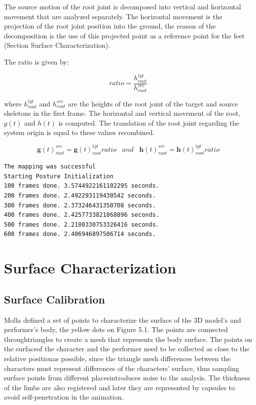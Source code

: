 \documentclass{vgtc}
\begin{document}
The source motion of the root joint is decomposed into vertical and
horizontal movement that are analyzed separately. The horizontal
movement is the projection of the root joint position into the ground,
the reason of the decomposition is the use of this projected point as a
reference point for the feet (Section Surface Characterization).

The ratio is given by:

\begin{equation}
    \label{eq:heightratio}
    ratio = \frac{h_{root}^{tgt}}{h_{root}^{src}}
    \end{equation}

where \(h_{root}^{tgt}\) and \(h_{root}^{src}\) are the heights of the
root joint of the target and source skeletons in the first frame. The
horizontal and vertical movement of the root, \(g(t)\) and \(h(t)\) is
computed. The translation of the root joint regarding the system origin
is equal to these values recombined.

\begin{equation}
    \label{eq:rootmov}
    \mathbf{g}(t)_{root}^{src} = \mathbf{g}(t)_{root}^{tgt} ratio \hspace{10pt} and \hspace{10pt}
    \mathbf{h}(t)_{root}^{src} = \mathbf{h}(t)_{root}^{tgt} ratio
    \end{equation}


    \begin{Verbatim}[commandchars=\\\{\}]
The mapping was successful
Starting Posture Initialization
100 frames done. 3.5744922161102295 seconds.
200 frames done. 2.492293119430542 seconds.
300 frames done. 2.373246431350708 seconds.
400 frames done. 2.4257733821868896 seconds.
500 frames done. 2.2180330753326416 seconds.
600 frames done. 2.406946897506714 seconds.

    \end{Verbatim}


    \section{Surface Characterization}\label{surface-characterization}

\subsection{Surface Calibration}\label{surface-calibration}

Molla defined a set of points to characterize the surface of the 3D
model's and performer's body, the yellow dots on Figure 5.1. The points
are connected throughtriangles to create a mesh that represents the body
surface. The points on the surfaceof the character and the performer
need to be collected as close to the relative positionas possible, since
the triangle mesh differences between the characters must represent
differences of the characters' surface, thus sampling surface points
from different placesintroduces noise to the analysis. The thickness of
the limbs are also registered and later they are represented by capsules
to avoid self-penetration in the animation.
\end{document}
